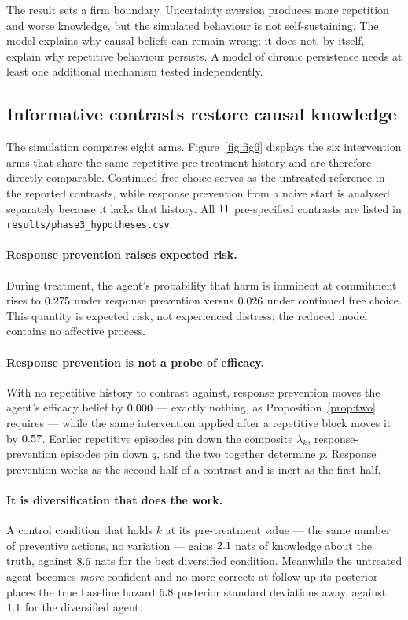 \documentclass[11pt]{article}
\begin{document}
The result sets a firm boundary. Uncertainty aversion produces more repetition
and worse knowledge, but the simulated behaviour is not self-sustaining. The
model explains why causal beliefs can remain wrong; it does not, by itself,
explain why repetitive behaviour persists. A model of chronic persistence needs
at least one additional mechanism tested independently.

\subsection{Informative contrasts restore causal knowledge}
\label{sec:interventions}

The simulation compares eight arms. Figure~\ref{fig:fig6} displays the six
intervention arms that share the same repetitive pre-treatment history and are
therefore directly comparable. Continued free choice serves as the untreated
reference in the reported contrasts, while response prevention from a naive start
is analysed separately because it lacks that history. All $11$
pre-specified contrasts are listed in
\texttt{results/phase3\_hypotheses.csv}.

\paragraph{Response prevention raises expected risk.} During treatment, the
agent's probability that harm is imminent at commitment rises to
$0.275$ under response prevention versus $0.026$ under
continued free choice. This quantity is expected risk, not experienced distress;
the reduced model contains no affective process.

\paragraph{Response prevention is not a probe of efficacy.} With no repetitive
history to contrast against, response prevention moves the agent's efficacy
belief by $0.000$ --- exactly nothing, as
Proposition~\ref{prop:two} requires --- while the same intervention applied after
a repetitive block moves it by $0.57$. Earlier repetitive episodes
pin down the composite $\lambda_{k}$, response-prevention
episodes pin down $q$, and the two together determine $p$. Response prevention
works as the second half of a contrast and is inert as the first half.

\paragraph{It is diversification that does the work.} A control condition that
holds $k$ at its pre-treatment value --- the same number of preventive actions,
no variation --- gains $2.1$ nats of knowledge about the truth, against
$8.6$ nats for the best diversified condition. Meanwhile the
untreated agent becomes \emph{more} confident and no more correct: at follow-up
its posterior places the true baseline hazard $5.8$ posterior standard
deviations away, against $1.1$ for the diversified agent.
\end{document}
